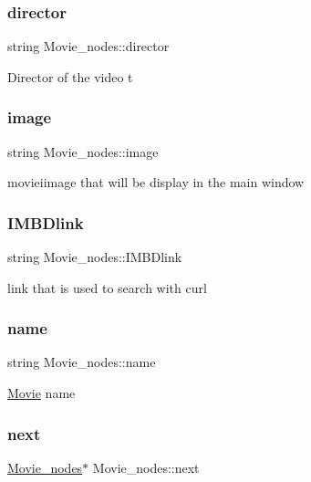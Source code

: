 \subsubsection{\texorpdfstring{director}{director}}
{\footnotesize\ttfamily string Movie\+\_\+nodes\+::director}

Director of the video t \mbox{\label{classMovie__nodes_ac67e06cbb47f1caa0b8656fb7160c6ea}} 
\subsubsection{\texorpdfstring{image}{image}}
{\footnotesize\ttfamily string Movie\+\_\+nodes\+::image}

movieiimage that will be display in the main window \mbox{\label{classMovie__nodes_ac4c6c5723294e3f05387a2ac31c68cdf}} 
\subsubsection{\texorpdfstring{I\+M\+B\+Dlink}{IMBDlink}}
{\footnotesize\ttfamily string Movie\+\_\+nodes\+::\+I\+M\+B\+Dlink}

link that is used to search with curl \mbox{\label{classMovie__nodes_a4c163d6e132a771181fbbda75c86daa9}} 
\subsubsection{\texorpdfstring{name}{name}}
{\footnotesize\ttfamily string Movie\+\_\+nodes\+::name}

\hyperlink{classMovie}{Movie} name \mbox{\label{classMovie__nodes_a6b336921094b1c3bfa9ffbcab56a2552}} 
\subsubsection{\texorpdfstring{next}{next}}
{\footnotesize\ttfamily \hyperlink{classMovie__nodes}{Movie\+\_\+nodes}$\ast$ Movie\+\_\+nodes\+::next}

